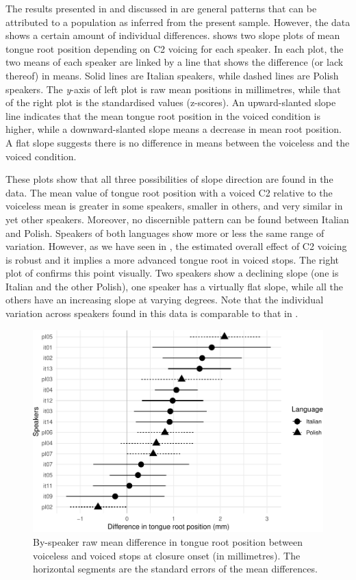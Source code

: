 \documentclass[12pt,]{article}
\begin{document}
The results presented in  and discussed in
 are general patterns that can be attributed to a
population as inferred from the present sample. However, the data shows
a certain amount of individual differences. 
shows two slope plots of mean tongue root position depending on C2
voicing for each speaker. In each plot, the two means of each speaker
are linked by a line that shows the difference (or lack thereof) in
means. Solid lines are Italian speakers, while dashed lines are Polish
speakers. The \emph{y}-axis of left plot is raw mean positions in
millimetres, while that of the right plot is the standardised values
(z-scores). An upward-slanted slope line indicates that the mean tongue
root position in the voiced condition is higher, while a
downward-slanted slope means a decrease in mean root position. A flat
slope suggests there is no difference in means between the voiceless and
the voiced condition.

These plots show that all three possibilities of slope direction are
found in the data. The mean value of tongue root position with a voiced
C2 relative to the voiceless mean is greater in some speakers, smaller
in others, and very similar in yet other speakers. Moreover, no
discernible pattern can be found between Italian and Polish. Speakers of
both languages show more or less the same range of variation. However,
as we have seen in , the estimated overall effect of C2
voicing is robust and it implies a more advanced tongue root in voiced
stops. The right plot of  confirms this point
visually. Two speakers show a declining slope (one is Italian and the
other Polish), one speaker has a virtually flat slope, while all the
others have an increasing slope at varying degrees. Note that the
individual variation across speakers found in this data is comparable to
that in \citet{ahn2018}.

\begin{figure}
\includegraphics[width=\linewidth]{2018-tra_files/figure-latex/trp-difference-1} \caption{By-speaker raw mean difference in tongue root position between voiceless and voiced stops at closure onset (in millimetres). The horizontal segments are the standard errors of the mean differences.}\label{f:trp-difference}
\end{figure}
\end{document}
